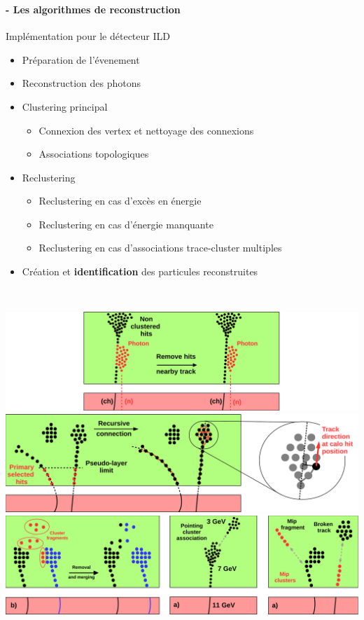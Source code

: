 \documentclass[8pt]{beamer}
\begin{document}
  \begin{frame}
  \frametitle{\secname}
  \framesubtitle{\subsecname - Les algorithmes de reconstruction}
    \begin{block}{Implémentation pour le détecteur ILD}
      \begin{itemize}
        \item<1-> Préparation de l'évenement
        \item<2-> Reconstruction des photons
        \item<3-> Clustering principal
        \begin{itemize}
          \item<3-> Connexion des vertex et nettoyage des connexions
          \item<4-> Associations topologiques
        \end{itemize}
        \item<5-> Reclustering
        \begin{itemize}
          \item<5-> Reclustering en cas d'excès en énergie
          \item<5-> Reclustering en cas d'énergie manquante
          \item<5-> Reclustering en cas d'associations trace-cluster multiples
        \end{itemize}
        \item<7-> Création et \textbf{identification} des particules reconstruites
      \end{itemize}
    \end{block}
    ~ \\
    \begin{overprint}
       \centering \includegraphics[width=0.8\linewidth]{NearbyTrackPhotonRemovalILD.pdf}
       \centering \includegraphics[width=0.8\linewidth]{TrackDrivenSeeding.pdf}
       \centering \includegraphics[width=0.8\linewidth]{ILDTopologicalAssociations.pdf}

\end{overprint}
\end{frame}
\end{document}
